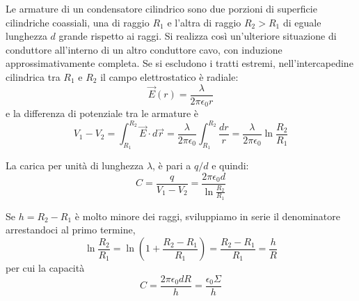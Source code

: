 \documentclass[class=book, crop=false, oneside, 12pt]{standalone}
\begin{document}
Le armature di un condensatore cilindrico sono due porzioni di superficie cilindriche coassiali, una di raggio \(R_1\) e l'altra di raggio \(R_2 > R_1\) di eguale lunghezza \(d\) grande rispetto ai raggi. 
Si realizza così un'ulteriore situazione di conduttore all'interno di un altro conduttore cavo, con induzione approssimativamente completa. 
Se si escludono i tratti estremi, nell'intercapedine cilindrica tra \(R_1\) e \(R_2\) il campo elettrostatico è radiale:
\begin{equation*}
    \overrightarrow{E}(r) = \frac{\lambda}{2 \pi \epsilon_0 r}
\end{equation*} 
e la differenza di potenziale tra le armature è
\begin{equation*}
    V_1 - V_2 = \int_{R_1}^{R_2} \overrightarrow{E} \cdot d \overrightarrow{r} = \frac{\lambda}{2 \pi \epsilon_0} \int_{R_1}^{R_2} \frac{d r}{r} = \frac{\lambda}{2 \pi \epsilon_0} \ln \frac{R_2}{R_1}
\end{equation*}

La carica per unità di lunghezza \(\lambda\), è pari a \(q/d\) e quindi:
\begin{equation} \label{capacita_condensatre_cilindrico}
    C = \frac{q}{V_1 - V_2} = \frac{2 \pi \epsilon_0 d}{\ln \frac{R_2}{R_1}}
\end{equation}

Se \(h = R_2 -R_1\) è molto minore dei raggi, sviluppiamo in serie il denominatore arrestandoci al primo termine,
\begin{equation*}
    \ln \frac{R_2}{R_1} = \ln \left(1 + \frac{R_2 - R_1}{R_1}\right) = \frac{R_2 - R_1}{R_1} = \frac{h}{R}
\end{equation*}
per cui la capacità
\begin{equation}
    C = \frac{2 \pi \epsilon_0 d R}{h} = \frac{\epsilon_0 \Sigma}{h}
\end{equation}
\end{document}
